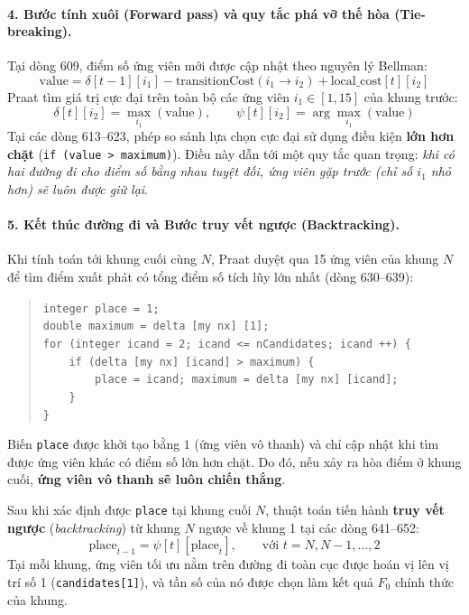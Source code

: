 \paragraph{4. Bước tính xuôi (Forward pass) và quy tắc phá vỡ thế hòa (Tie-breaking).}
Tại dòng 609, điểm số ứng viên mới được cập nhật theo nguyên lý Bellman:
\begin{equation}
    \text{value} = \delta[t-1][i_1] - \text{transitionCost}(i_1 \to i_2) + \text{local\_cost}[t][i_2]
\end{equation}
Praat tìm giá trị cực đại trên toàn bộ các ứng viên $i_1 \in [1, 15]$ của khung trước:
\begin{equation}
    \delta[t][i_2] = \max_{i_1} (\text{value}), \qquad \psi[t][i_2] = \arg\max_{i_1} (\text{value})
\end{equation}
Tại các dòng 613--623, phép so sánh lựa chọn cực đại sử dụng điều kiện \textbf{lớn hơn chặt} (\texttt{if (value > maximum)}). Điều này dẫn tới một quy tắc quan trọng: \emph{khi có hai đường đi cho điểm số bằng nhau tuyệt đối, ứng viên gặp trước (chỉ số $i_1$ nhỏ hơn) sẽ luôn được giữ lại}.

\paragraph{5. Kết thúc đường đi và Bước truy vết ngược (Backtracking).}
Khi tính toán tới khung cuối cùng $N$, Praat duyệt qua 15 ứng viên của khung $N$ để tìm điểm xuất phát có tổng điểm số tích lũy lớn nhất (dòng 630--639):
\begin{quote}
\small
\texttt{integer place = 1;}\\
\texttt{double maximum = delta [my nx] [1];}\\
\texttt{for (integer icand = 2; icand <= nCandidates; icand ++) \{}\\
\texttt{\ \ \ \ if (delta [my nx] [icand] > maximum) \{}\\
\texttt{\ \ \ \ \ \ \ \ place = icand; maximum = delta [my nx] [icand];}\\
\texttt{\ \ \ \ \}}\\
\texttt{\}}
\end{quote}
Biến \texttt{place} được khởi tạo bằng $1$ (ứng viên vô thanh) và chỉ cập nhật khi tìm được ứng viên khác có điểm số lớn hơn chặt. Do đó, nếu xảy ra hòa điểm ở khung cuối, \textbf{ứng viên vô thanh sẽ luôn chiến thắng}.

Sau khi xác định được \texttt{place} tại khung cuối $N$, thuật toán tiến hành \textbf{truy vết ngược} (\emph{backtracking}) từ khung $N$ ngược về khung 1 tại các dòng 641--652:
\begin{equation}
    \text{place}_{t-1} = \psi[t][\text{place}_t], \qquad \text{với } t = N, N-1, \dots, 2
\end{equation}
Tại mỗi khung, ứng viên tối ưu nằm trên đường đi toàn cục được hoán vị lên vị trí số 1 (\texttt{candidates[1]}), và tần số của nó được chọn làm kết quả $F_0$ chính thức của khung.

